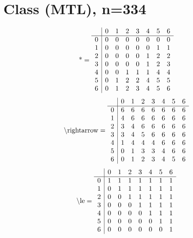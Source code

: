 \documentclass[11pt]{article}
\begin{document}
\section{Class (MTL), n=334}
\[\text{*} = 
\begin{array}{r | r r r r r r r}
 & 0 & 1 & 2 & 3 & 4 & 5 & 6 \\ \hline
0 & 0 & 0 & 0 & 0 & 0 & 0 & 0 \\
1 & 0 & 0 & 0 & 0 & 0 & 1 & 1 \\
2 & 0 & 0 & 0 & 0 & 1 & 2 & 2 \\
3 & 0 & 0 & 0 & 0 & 1 & 2 & 3 \\
4 & 0 & 0 & 1 & 1 & 1 & 4 & 4 \\
5 & 0 & 1 & 2 & 2 & 4 & 5 & 5 \\
6 & 0 & 1 & 2 & 3 & 4 & 5 & 6 \\
\end{array}
\]
\[\text{\textbackslash rightarrow} = 
\begin{array}{r | r r r r r r r}
 & 0 & 1 & 2 & 3 & 4 & 5 & 6 \\ \hline
0 & 6 & 6 & 6 & 6 & 6 & 6 & 6 \\
1 & 4 & 6 & 6 & 6 & 6 & 6 & 6 \\
2 & 3 & 4 & 6 & 6 & 6 & 6 & 6 \\
3 & 3 & 4 & 5 & 6 & 6 & 6 & 6 \\
4 & 1 & 4 & 4 & 4 & 6 & 6 & 6 \\
5 & 0 & 1 & 3 & 3 & 4 & 6 & 6 \\
6 & 0 & 1 & 2 & 3 & 4 & 5 & 6 \\
\end{array}
\]
\[\text{\textbackslash le} = 
\begin{array}{r | r r r r r r r}
 & 0 & 1 & 2 & 3 & 4 & 5 & 6 \\ \hline
0 & 1 & 1 & 1 & 1 & 1 & 1 & 1 \\
1 & 0 & 1 & 1 & 1 & 1 & 1 & 1 \\
2 & 0 & 0 & 1 & 1 & 1 & 1 & 1 \\
3 & 0 & 0 & 0 & 1 & 1 & 1 & 1 \\
4 & 0 & 0 & 0 & 0 & 1 & 1 & 1 \\
5 & 0 & 0 & 0 & 0 & 0 & 1 & 1 \\
6 & 0 & 0 & 0 & 0 & 0 & 0 & 1 \\
\end{array}
\]
\end{document}
